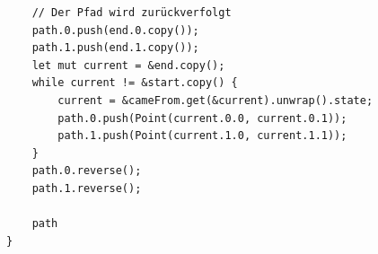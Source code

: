 \documentclass[a4paper,10pt,ngerman]{scrartcl}
\begin{document}
\begin{verbatim}
    // Der Pfad wird zurückverfolgt
    path.0.push(end.0.copy());
    path.1.push(end.1.copy());
    let mut current = &end.copy();
    while current != &start.copy() {
        current = &cameFrom.get(&current).unwrap().state;
        path.0.push(Point(current.0.0, current.0.1));
        path.1.push(Point(current.1.0, current.1.1));
    }
    path.0.reverse();
    path.1.reverse();

    path
}


    \end{verbatim}
\end{document}

